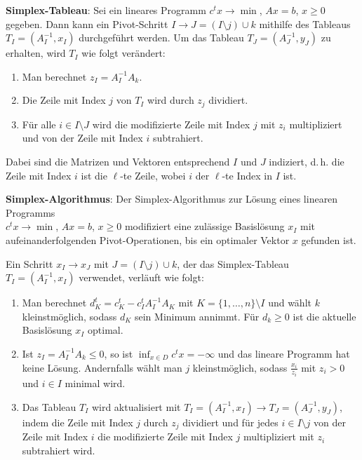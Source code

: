 \textbf{Simplex-Tableau}:
Sei ein lineares Programm $c^t x \rightarrow \min$, $Ax = b$, $x \ge 0$
gegeben.
Dann kann ein Pivot-Schritt $I \rightarrow J = (I \setminus j) \cup k$
mithilfe des Tableaus $T_I = (A_I^{-1}, x_I)$ durchgeführt werden.
Um das Tableau $T_J = (A_J^{-1}, y_J)$ zu erhalten, wird $T_I$ wie folgt
verändert:
\begin{enumerate}
    \item
    Man berechnet $z_I = A_I^{-1} A_k$.
    
    \item
    Die Zeile mit Index $j$ von $T_I$ wird durch $z_j$ dividiert.
    
    \item
    Für alle $i \in I \setminus J$ wird die modifizierte Zeile mit Index $j$
    mit $z_i$ multipliziert und von der Zeile mit Index $i$ subtrahiert.
\end{enumerate}
Dabei sind die Matrizen und Vektoren entsprechend $I$ und $J$ indiziert,
d.\,h. die Zeile mit Index $i$ ist die $\ell$-te Zeile, wobei $i$ der
$\ell$-te Index in $I$ ist.

\linie

\textbf{Simplex-Algorithmus}:
Der Simplex-Algorithmus zur Lösung eines linearen Programms \\
$c^t x \rightarrow \min$, $Ax = b$, $x \ge 0$
modifiziert eine zulässige Basislösung $x_I$ mit aufeinanderfolgenden
Pivot-Operationen, bis ein optimaler Vektor $x$ gefunden ist.

Ein Schritt $x_I \rightarrow x_J$ mit $J = (I \setminus j) \cup k$,
der das Simplex-Tableau $T_I = (A_I^{-1}, x_I)$ verwendet, verläuft wie folgt:
\begin{enumerate}
    \item
    Man berechnet $d_K^t = c_K^t - c_I^t A_I^{-1} A_K$ mit
    $K = \{1, \dotsc, n\} \setminus I$ und wählt $k$ kleinstmöglich,
    sodass $d_K$ sein Minimum annimmt.
    Für $d_k \ge 0$ ist die aktuelle Basislösung $x_I$ optimal.
    
    \item
    Ist $z_I = A_I^{-1} A_k \le 0$, so ist $\inf_{x \in D} c^t x = -\infty$
    und das lineare Programm hat keine Lösung.
    Andernfalls wählt man $j$ kleinstmöglich, sodass
    $\frac{x_i}{z_i}$ mit $z_i > 0$ und $i \in I$ minimal wird.
    
    \item
    Das Tableau $T_I$ wird aktualisiert mit
    $T_I = (A_I^{-1}, x_I) \rightarrow T_J = (A_J^{-1}, y_J)$, indem
    die Zeile mit Index $j$ durch $z_j$ dividiert und
    für jedes $i \in I \setminus j$ von der Zeile mit Index $i$
    die modifizierte Zeile mit Index $j$ multipliziert mit $z_i$ subtrahiert
    wird.
\end{enumerate}

